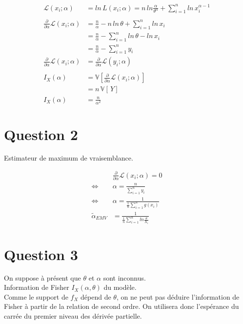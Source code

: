 \documentclass[
  12pt,
]{scrreprt}
\begin{document}
\[\begin{aligned}
\mathcal{L}(x_i;\alpha) &= ln\, L(x_i;\alpha) = n\,ln\frac{\alpha}{\theta^\alpha} + \sum_{i=1}^n ln\,x_i^{\alpha-1}\\
&\\
\frac{\partial}{\partial \alpha}\mathcal{L}(x_i;\alpha)&=\frac{n}{\alpha}-n\,ln\,\theta + \sum_{i=1}^n ln\,x_i\\
&=\frac{n}{\alpha} - \sum_{i=1}^n ln\,\theta-ln\,x_i\\
&=\frac{n}{\alpha} - \sum_{i=1}^n y_i\\
\frac{\partial}{\partial \alpha}\mathcal{L}(x_i;\alpha)&=\frac{\partial}{\partial \alpha}\mathcal{L}(y_i;\alpha)\\
&\\
I_X(\alpha)&=\mathbb{V}\left [ \frac{\partial}{\partial \alpha}\mathcal{L}(x_i;\alpha)\right ]\\
&=n\,\mathbb{V}[\,Y]\,\\
I_X(\alpha)&=\frac{n}{\alpha^2}
\end{aligned}\]

\hypertarget{question-2}{%
\section{Question 2}\label{question-2}}

Estimateur de maximum de vraisemblance.

\[\begin{aligned}
&\frac{\partial}{\partial \alpha}\mathcal{L}(x_i;\alpha) = 0\\
\Leftrightarrow\quad &\alpha=\frac{n}{\sum_{i=1}^n y_i}\\
\Leftrightarrow\quad &\alpha=\frac{1}{\frac{1}{n}\sum_{i=1}^n g(x_i)}\\
\tilde{\alpha}_{EMV} &= \frac{1}{\frac{1}{n}\sum_{i=1}^n ln\frac{\theta}{X_i}}
\end{aligned}\]

\hypertarget{question-3}{%
\section{Question 3}\label{question-3}}

On suppose à présent que \(\theta\) et \(\alpha\) sont inconnus.\\
Information de Fisher \(I_X(\alpha,\theta)\) du modèle.\\
Comme le support de \(f_X\) dépend de \(\theta\), on ne peut pas déduire l'information de Fisher à partir de la relation de second ordre. On utilisera donc l'espérance du carrée du premier niveau des dérivée partielle.
\end{document}

